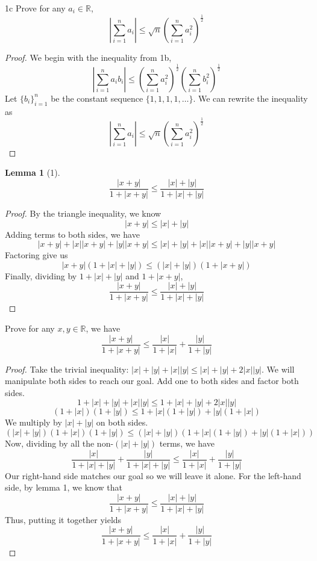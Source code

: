 \documentclass[boxes]{rutgers_hw}
\newtheorem*{lemma}{Lemma}
\begin{document}
  \pagebreak

  \begin{exern}{1c}
    Prove for any $a_i \in \mathbb{R}$,
    \[ \left| \sum_{i=1}^n a_i \right| \le \sqrt{n}{\left( \sum_{i=1}^n a_i^2\right)}^\frac12\]
  \end{exern}
  \begin{proof}
    We begin with the inequality from 1b,
    \[ \left| \sum_{i=1}^n a_i b_i\right| \le {\left(\sum_{i=1}^n a_i^2\right)}^\frac12{\left(\sum_{i=1}^n b_i^2\right)}^\frac12\]
    Let ${\{b_i \}}_{i=1}^n$ be the constant sequence $\{1,1,1,1,\dots\}$. 
    We can rewrite the inequality as
    \[ \left| \sum_{i=1}^n a_i \right| \le \sqrt{n}{\left( \sum_{i=1}^n a_i^2\right)}^\frac12\]
  \end{proof}

  \pagebreak

  \begin{lemma}[1]
    \[ \frac{|x + y|}{1 + |x + y|} \le \frac{|x| + |y|}{1 + |x| + |y|}\]
  \end{lemma}
  \begin{proof}
    By the triangle inequality, we know
    \[ |x + y| \le |x| + |y|\]
    Adding terms to both sides, we have
    \[ |x+y| + |x||x+y| + |y||x+y| \le |x| + |y| + |x||x+y| + |y||x+y|\]
    Factoring give us
    \[ |x + y| (1 + |x| + |y|) \le (|x| + |y|)(1 + |x + y|)\]
    Finally, dividing by $1 + |x| + |y|$ and $1 + |x+y|$,
    \[ \frac{|x + y|}{1 + |x + y|} \le \frac{|x| + |y|}{1 + |x| + |y|}\]
  \end{proof}

  \begin{exern}{2}
    Prove for any $x,y \in \mathbb{R}$, we have
    \[ \frac{|x+y|}{1 + |x+y|} \le \frac{|x|}{1+|x|} + \frac{|y|}{1+ |y|} \]
  \end{exern}
  \begin{proof}
    Take the trivial inequality: $|x| + |y| + |x||y| \le |x| + |y| + 2|x||y|$.
    We will manipulate both sides to reach our goal. Add one to both sides and factor both sides.
    \[ 1 + |x| + |y| + |x||y| \le 1 + |x| + |y| + 2|x||y| \]
    \[ (1 + |x|)(1 + |y|) \le 1 + |x|(1+|y|) + |y|(1 + |x|)\]
    We multiply by $|x| + |y|$ on both sides.
    \[ (|x| + |y|)(1+|x|)(1+|y|) \le (|x| + |y|)(1 + |x|(1+|y|) + |y|(1 + |x|))\]
    Now, dividing by all the non-$(|x| + |y|)$ terms, we have
    \[ \frac{|x|}{1 + |x| + |y|} + \frac{|y|}{1 + |x| + |y|} \le \frac{|x|}{1 + |x|} + \frac{|y|}{1+|y|}\]
    Our right-hand side matches our goal so we will leave it alone. 
    For the left-hand side, by lemma 1, we know that 
    \[ \frac{|x + y|}{1 + |x + y|} \le \frac{|x| + |y|}{1 + |x| + |y|}\]
    Thus, putting it together yields
    \[\frac{|x+y|}{1 + |x+y|} \le \frac{|x|}{1+|x|} + \frac{|y|}{1+ |y|} \]

  \end{proof}
\end{document}
